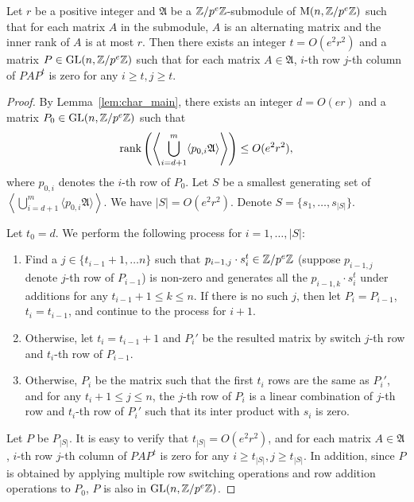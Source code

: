 \begin{lemma}\label{lem:char_skew}
Let $r$ be a positive integer and $\mathfrak{A}$ be a $\mathbb{Z} / p^e \mathbb{Z}$-submodule of $\mathrm{M}(n, \mathbb{Z} / p^e \mathbb{Z})$ 
such that 
for each matrix $A$ in the submodule, $A$ is an alternating matrix and the inner rank of $A$ is at most $r$. %
Then there exists an integer $t = O(e^2 r^2)$ and a matrix $P \in \mathrm{GL}(n, \mathbb{Z} / p^e \mathbb{Z})$ such that for each matrix $A \in \mathfrak{A}$,
$i$-th row $j$-th column of $P A P^t$ is zero for any $i \geq t, j \geq t$. %
\end{lemma}
\begin{proof}
By Lemma~\ref{lem:char_main}, there exists an integer $d = O(er)$ and a matrix $P_0 \in \mathrm{GL}(n, \mathbb{Z} / p^e \mathbb{Z})$ such that  
\[\rank\left(\left\langle \bigcup_{i = d+1}^{m} \langle p_{0, i} \mathfrak{A}\rangle \right\rangle\right) \leq O(e^2 r^2),\]
where $p_{0, i}$ denotes the $i$-th row of $P_0$. 
Let $S$ be a smallest generating set of  $\left\langle \bigcup_{i = d+1}^{m} \langle p_{0, i} \mathfrak{A}\rangle \right\rangle$. We have $|S| = O(e^2 r^2)$. 
Denote $S = \{s_1, \dots, s_{|S|}\}$. 

Let $t_0 = d$. 
We perform the following process for $i = 1, \dots, |S|$: 
\begin{enumerate}
\item Find a  $j \in \{t_{i-1} + 1, \dots n\}$ such that $p_{i-1, j} \cdot s_i^t \in \mathbb{Z} / p^e \mathbb{Z}$ (suppose $p_{i - 1, j}$ denote $j$-th row of $P_{i-1}$) is non-zero and generates all the $p_{i-1, k} \cdot s_i^t$ under additions for any $t_{i-1} + 1\leq k \leq n$. %
If there is no such $j$, then let $P_i = P_{i-1}$, $t_i = t_{i - 1}$,  and continue to the process for $i + 1$. 
\item Otherwise, let $t_i = t_{i-1} + 1$ and $P_i'$ be the resulted matrix by switch $j$-th row and $t_i$-th row of $P_{i-1}$.
\item Otherwise, $P_i$ be the matrix such that the first $t_i$ rows are the same as $P_i'$, and for any $t_i + 1 \leq j \leq n$, 
the $j$-th row of $P_i$ is a linear combination of $j$-th row and $t_i$-th row of $P_i'$ such that its inter product with $s_i$ is zero. 
\end{enumerate}
Let $P$ be $P_{|S|}$. 
It is easy to verify that $t_{|S|} = O(e^2 r^2)$, and for each matrix $A \in \mathfrak{A}$,
$i$-th row $j$-th column of $P A P^t$ is zero for any $i \geq t_{|S|}, j \geq t_{|S|}$.
In addition, since $P$ is obtained by applying multiple row switching operations and row addition operations to $P_0$, $P$ is also in $\mathrm{GL}(n, \mathbb{Z} / p^e \mathbb{Z})$. 
\end{proof}

